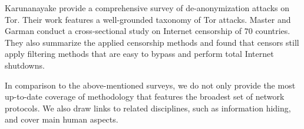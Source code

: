 %
Karunanayake \ea \cite{karunanayake2021anonymisation} provide a comprehensive survey of de-anonymization attacks on Tor. Their work features a well-grounded taxonomy of Tor attacks. 
%
Master and Garman \cite{master2023worldwide} conduct a cross-sectional study on Internet censorship of $70$ countries. They also summarize the applied censorship methods and found that censors still apply filtering methods that are easy to bypass and perform total Internet shutdowns. 
%
%

In comparison to the above-mentioned surveys, we do not only provide the most up-to-date coverage of methodology that features the broadest set of network protocols. We also draw links to related disciplines, such as information hiding, and cover main human aspects.